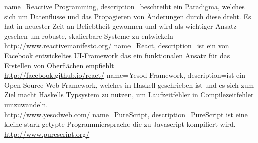{
  name=Reactive Programming,
  description={beschreibt ein Paradigma, welches sich um Datenflüsse und das Propagieren von Änderungen durch diese dreht.
  Es hat in neuester Zeit an Beliebtheit gewonnen und wird als wichtiger Ansatz gesehen um robuste, skalierbare Systeme zu entwickeln\\
  \url{http://www.reactivemanifesto.org/}
  }
}
{
  name=React,
  description={ist ein von Facebook entwickeltes UI-Framework das ein funktionalen Ansatz für das Erstellen von Oberflächen empfiehlt\\
  \url{http://facebook.github.io/react/}
  }
}
{
  name=Yesod Framework,
  description={ist ein Open-Source Web-Framework, welches in Haskell geschrieben ist und es sich zum Ziel macht Haskells Typsystem zu nutzen,
  um Laufzeitfehler in Compilezeitfehler umzuwandeln.\\
  \url{http://www.yesodweb.com/}
  }
}
{
  name=PureScript,
  description={PureScript ist eine kleine stark getypte Programmiersprache die zu Javascript kompiliert wird.\\
  \url{http://www.purescript.org/}
  }
}

